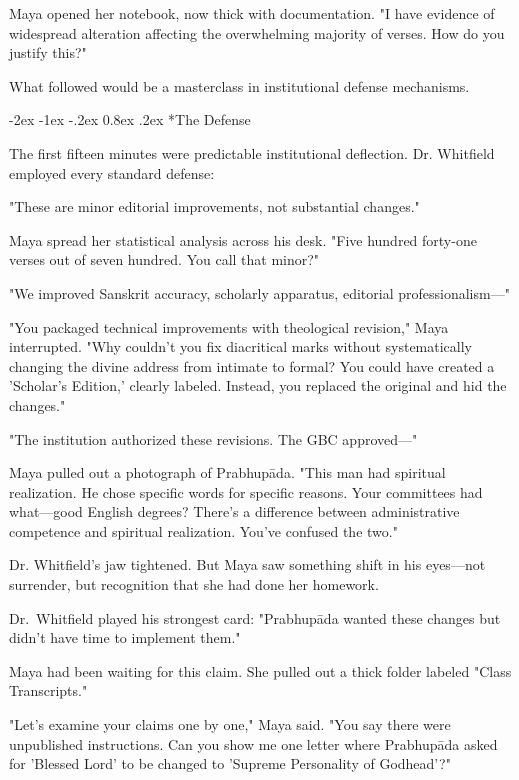 \documentclass[12pt,twoside]{book}
\makeatletter
\let\oldsubsection\subsection
\renewcommand{\subsection}[1]{\needspace{3\baselineskip}\oldsubsection{#1}}
\renewcommand\subsection{\@startsection{subsection}{2}{\z@}%
{-2ex \@plus -1ex \@minus -.2ex}%
{0.8ex \@plus .2ex}%
{\normalfont\large\bfseries}}
\makeatother
\begin{document}
Maya opened her notebook, now thick with documentation. "I have evidence of widespread alteration affecting the overwhelming majority of verses. How do you justify this?"

What followed would be a masterclass in institutional defense mechanisms.


\vspace{0.1cm}
\subsection*{The Defense}


The first fifteen minutes were predictable institutional deflection.
Dr. Whitfield employed every standard defense:

"These are minor editorial improvements, not substantial changes."

Maya spread her statistical analysis across his desk. "Five hundred forty-one verses out of seven hundred. You call that minor?"

"We improved Sanskrit accuracy, scholarly apparatus, editorial professionalism—"

"You packaged technical improvements with theological revision," Maya interrupted. "Why couldn't you fix diacritical marks without systematically changing the divine address from intimate to formal? You could have created a 'Scholar's Edition,' clearly labeled. Instead, you replaced the original and hid the changes."

"The institution authorized these revisions. The GBC approved—"

Maya pulled out a photograph of Prabhupāda. "This man had spiritual realization. He chose specific words for specific reasons. Your committees had what—good English degrees? There's a difference between administrative competence and spiritual realization. You've confused the two."

Dr. Whitfield's jaw tightened. But Maya saw something shift in his eyes—not surrender, but recognition that she had done her homework.

Dr.~Whitfield played his strongest card: "Prabhupāda wanted these changes but didn't have time to implement them."

Maya had been waiting for this claim. She pulled out a thick folder labeled "Class Transcripts."

"Let's examine your claims one by one," Maya said. "You say there were unpublished instructions. Can you show me one letter where Prabhupāda asked for 'Blessed Lord' to be changed to 'Supreme Personality of Godhead'?"
\end{document}
